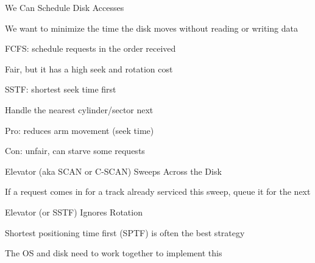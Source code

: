   \begin{frame}{We Can Schedule Disk Accesses}

    We want to minimize the time the disk moves without reading or writing data

    \vspace{2em}

    FCFS: schedule requests in the order received

    \hspace{2em} Fair, but it has a high seek and rotation cost

    \vspace{2em}

    SSTF: shortest seek time first

    \hspace{2em} Handle the nearest cylinder/sector next

    \hspace{4em} Pro: reduces arm movement (seek time)

    \hspace{4em} Con: unfair, can starve some requests
  \end{frame}

  \begin{frame}{Elevator (aka SCAN or C-SCAN) Sweeps Across the Disk}
    \begin{center}
    \end{center}

    If a request comes in for a track already serviced this sweep, queue it for
    the next
  \end{frame}

  \begin{frame}{Elevator (or SSTF) Ignores Rotation}
    \begin{center}
    \end{center}

    Shortest positioning time first (SPTF) is often the best strategy

    \hspace{2em} The OS and disk need to work together to implement this
  \end{frame}

